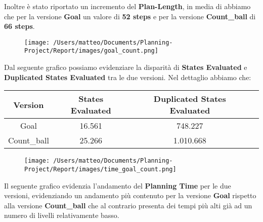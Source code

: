 \documentclass{article}
\begin{document}
Inoltre è stato riportato un incremento del \textbf{Plan-Length}, in media di abbiamo che per la versione \textbf{Goal} un valore di \textbf{52 steps} e per la versione \textbf{Count\_ball} di \textbf{66 steps}.
\begin{figure}[H]
    \centering
    \texttt{[image: /Users/matteo/Documents/Planning-Project/Report/images/goal\_count.png]}
    \label{fig:count_ball}
\end{figure}
\noindent
Dal seguente grafico possiamo evidenziare la disparità di \textbf{States Evaluated} e \textbf{Duplicated States Evaluated} tra le due versioni. Nel dettaglio abbiamo che:
\begin{table}[H]
    \centering
    \begin{tabular}{|c|c|c|c|}
        \hline
        \textbf{Version} & \textbf{States Evaluated} & \textbf{Duplicated States Evaluated} \\
        \hline
        Goal & 16.561 & 748.227 \\
        \hline
        Count\_ball & 25.266 & 1.010.668 \\
        \hline
    \end{tabular}
\end{table}
\begin{figure}[H]
    \centering
    \texttt{[image: /Users/matteo/Documents/Planning-Project/Report/images/time\_goal\_count.png]}
    \label{fig:count_ball_states}
\end{figure}
\noindent
Il seguente grafico evidenzia l'andamento del \textbf{Planning Time} per le due versioni, evidenziando un andamento più contenuto per la versione \textbf{Goal} 
rispetto alla versione \textbf{Count\_ball} che al contrario presenta dei tempi più alti già ad un numero di livelli relativamente basso.
\end{document}
